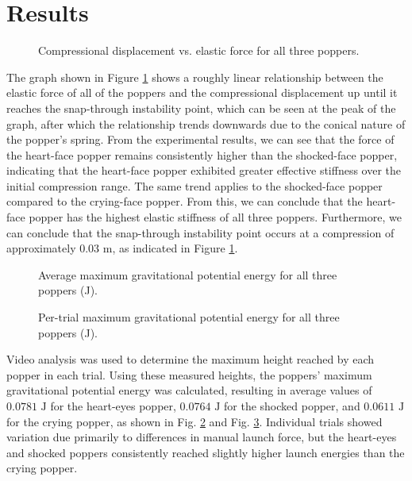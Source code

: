 \documentclass[12pt]{article}
\begin{document}
\section{Results}

\begin{figure}[H]
    \centering
    
    \caption{Compressional displacement vs. elastic force for all three poppers.}
    \label{fig:1}
\end{figure}

The graph shown in Figure \ref{fig:1} shows a roughly linear relationship between the elastic force of all of the poppers and the compressional displacement up until it reaches the snap-through instability point, which can be seen at the peak of the graph, after which the relationship trends downwards due to the conical nature of the popper’s spring. From the experimental results, we can see that the force of the heart-face popper remains consistently higher than the shocked-face popper, indicating that the heart-face popper exhibited greater effective stiffness over the initial compression range. The same trend applies to the shocked-face popper compared to the crying-face popper. From this, we can conclude that the heart-face popper has the highest elastic stiffness of all three poppers. Furthermore, we can conclude that the snap-through instability point occurs at a compression of approximately $0.03\text{ m}$, as indicated in Figure \ref{fig:1}.

\begin{figure}[H]
    \centering
    
    \caption{Average maximum gravitational potential energy for all three poppers (J).}
    \label{fig:2.1}
\end{figure}

\begin{figure}[H]
    \centering
    
    \caption{Per-trial maximum gravitational potential energy for all three poppers (J).}
    \label{fig:2.2}
\end{figure}

Video analysis was used to determine the maximum height reached by each popper in each trial. Using these measured heights, the poppers’ maximum gravitational potential energy was calculated, resulting in average values of $0.0781\text{ J}$ for the heart-eyes popper, $0.0764\text{ J}$ for the shocked popper, and $0.0611\text{ J}$ for the crying popper, as shown in Fig. \ref{fig:2.1} and Fig. \ref{fig:2.2}. Individual trials showed variation due primarily to differences in manual launch force, but the heart-eyes and shocked poppers consistently reached slightly higher launch energies than the crying popper.
\end{document}
